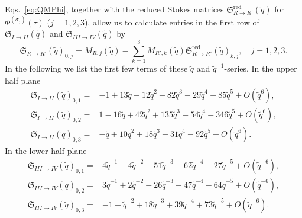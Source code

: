 \documentclass[12pt,reqno]{amsart}
\theoremstyle{definition}
\def\s{\sigma}
\def\tq{\tilde{q}}
\def\mf{\mathfrak}
\def\cO{O}
\begin{document}
Eqs.~\eqref{eq:QMPhi}, together with the reduced Stokes matrices
$\mf{S}^{\text{red}}_{R\rightarrow R'}(\tq)$ for $\Phi^{(\s_j)}(\tau)$
($j=1,2,3$), allow us to calculate entries in the first row of
$\mf{S}_{I\rightarrow II}(\tq)$ and $\mf{S}_{III\rightarrow IV}(\tq)$
by
\begin{equation}
  \mf{S}_{R\rightarrow R'}(\tq)_{0,j} =
  M_{R,j}(\tq) - \sum_{k=1}^3M_{R',k}(\tq)
  \mf{S}^{\text{red}}_{R\rightarrow R'}(\tq)_{k,j},\quad j=1,2,3.
\end{equation}
In the following we list the first few terms of these
$\tq$ and $\tq^{-1}$-series.  In the upper half plane
\begin{subequations}
  \begin{align}
    \mf{S}_{I\rightarrow II}(\tq)_{0,1}=
    &-1+13\tq-12\tq^2-82\tq^3-29\tq^4+85\tq^5+\cO(\tq^6) ,\\
    \mf{S}_{I\rightarrow II}(\tq)_{0,2}=
    &1-16\tq+42\tq^2+135\tq^3-54\tq^4-346\tq^5+\cO(\tq^6) ,\\
    \mf{S}_{I\rightarrow II}(\tq)_{0,3}=
    &-\tq+10\tq^2+18\tq^3-31\tq^4-92\tq^5+\cO(\tq^6).
  \end{align}
\end{subequations}
In the lower half plane
\begin{subequations}
  \begin{align}
    \mf{S}_{III\rightarrow IV}(\tq)_{0,1}=
    &4\tq^{-1}-4\tq^{-2}-51\tq^{-3}-62\tq^{-4}-27\tq^{-5}+\cO(\tq^{-6}) ,\\
    \mf{S}_{III\rightarrow IV}(\tq)_{0,2}=
    &3\tq^{-1}+2\tq^{-2}-26\tq^{-3}-47\tq^{-4}-64\tq^{-5}+\cO(\tq^{-6}) ,\\
    \mf{S}_{III\rightarrow IV}(\tq)_{0,3}=
    &-1+\tq^{-2}+18\tq^{-3}+39\tq^{-4}+73\tq^{-5}+\cO(\tq^{-6}).
  \end{align}
\end{subequations}
\end{document}

